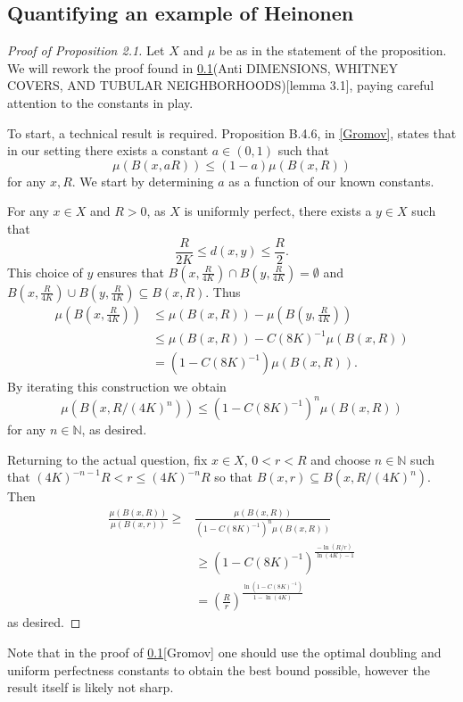 \documentclass[12pt]{amsart}
\numberwithin{equation}{section}
\renewcommand{\ge}{\geqslant}
\renewcommand{\le}{\leqslant}
\begin{document}
\subsection{Quantifying an example of Heinonen}



\begin{proof}[Proof of Proposition 2.1]
Let $X$ and $\mu$ be as in the statement of the proposition. We will rework the proof found in \ref{}(Anti DIMENSIONS, WHITNEY COVERS, AND TUBULAR NEIGHBORHOODS)[lemma 3.1], paying careful attention to the constants in play. 

To start, a technical result is required. Proposition B.4.6, in \ref{Gromov}, states that in our setting there exists a constant $a \in (0,1)$ such that 
\[
\mu(B(x,aR)) \le (1-a) \mu(B(x,R))
\]
for any $x,R$. We start by determining $a$ as a function of our known constants. 

For any $x\in X$ and $R>0$, as $X$ is uniformly perfect, there exists a $y \in X$ such that $$\frac{R}{2K} \le d(x,y) \le \frac{R}{2}.$$ This choice of $y$ ensures that $B(x,\frac{R}{4K}) \cap B(y,\frac{R}{4K}) = \emptyset $ and $B(x,\frac{R}{4K}) \cup B(y,\frac{R}{4K}) \subseteq B(x,R)$. Thus
\begin{align*}
\mu(B(x,\frac{R}{4K})) &\le \mu(B(x,R)) - \mu(B(y, \frac{R}{4K}))\\
& \le \mu(B(x,R)) - C(8K)^{-1}\mu(B(x,R)) \\
& = (1-C(8K)^{-1}) \mu(B(x,R)).
\end{align*}
By iterating this construction we obtain
\[
\mu(B(x,R/(4K)^n)) \le (1-C(8K)^{-1})^n \mu(B(x,R))
\]
for any $n\in \mathbb{N}$, as desired.

Returning to the actual question, fix $x\in X$, $0 < r < R$ and choose $n\in \mathbb{N}$ such that $(4K)^{-n-1}R < r \le (4K)^{-n}R$ so that $B(x,r) \subseteq B(x,R/(4K)^{n})$. Then
\begin{align*}
\frac{\mu(B(x,R))}{\mu(B(x,r))} \ge& \frac{\mu(B(x,R))}{(1-C(8K)^{-1})^n\mu(B(x,R))} \\
& \ge (1-C(8K)^{-1})^{\frac{-\ln(R/r)}{\ln(4K)-1}}\\
& = \left(\frac{R}{r}\right)^{\frac{\ln(1-C(8K)^{-1})}{1-\ln(4K)}}
\end{align*}
as desired.

\end{proof}

Note that in the proof of \ref{}[Gromov] one should use the optimal doubling  and uniform perfectness constants to obtain the best bound possible, however the result itself is likely not sharp.
 
\end{document}
